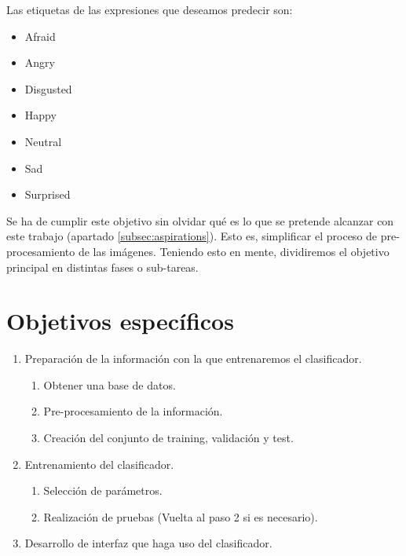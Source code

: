 \documentclass[a4paper,11pt]{book}
\begin{document}
Las etiquetas de las expresiones que deseamos predecir son:
\begin{multicols}{2}
	\label{list:expressions}
	\begin{itemize}
		\item Afraid
		\item Angry
		\item Disgusted
		\item Happy
		\item Neutral
		\item Sad
		\item Surprised
	\end{itemize}
\end{multicols}
Se ha de cumplir este objetivo sin olvidar qué es lo que se pretende alcanzar con este trabajo (apartado \ref{subsec:aspirations}). Esto es, simplificar el proceso de pre-procesamiento de las imágenes. Teniendo esto en mente, dividiremos el objetivo principal en distintas fases o sub-tareas.

\section{Objetivos específicos}
\begin{enumerate}
	\item Preparación de la información con la que entrenaremos el clasificador.
	\begin{enumerate}
		\item Obtener una base de datos.
		\item Pre-procesamiento de la información.
		\item Creación del conjunto de training, validación y test.
	\end{enumerate}
	\item Entrenamiento del clasificador.
	\begin{enumerate}
		\item Selección de parámetros.
		\item Realización de pruebas (Vuelta al paso 2 si es necesario).
	\end{enumerate}
	\item Desarrollo de interfaz que haga uso del clasificador.
\end{enumerate}
\end{document}
